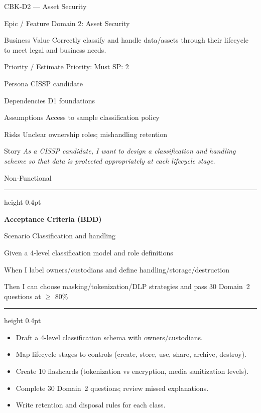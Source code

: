 \documentclass[11pt,a4paper]{article}
\providecommand{\square}{\fbox{\rule{0pt}{0.85ex}\rule{0.85ex}{0pt}}}%
\newcommand{\citem}{\item[$\square$]}
\newcommand{\Tag}[1]{\tcbox[on line, colback=PillBack, colframe=PillBack,
  coltext=PillText, boxrule=0pt, arc=2mm, left=2pt, right=2pt, top=1pt, bottom=1pt]{\small #1}}
\newcommand{\ThinRule}{\par\vspace{4pt}\hrule height 0.4pt\par\vspace{4pt}}
\begin{document}
\clearpage
\begin{StoryCardBox}{CBK-D2 --- Asset Security}
\begin{metadesc}
\item[Epic / Feature] Domain 2: Asset Security
\item[Business Value] Correctly classify and handle data/assets through their lifecycle to meet legal and business needs.
\item[Priority / Estimate] Priority: Must \quad SP: 2
\item[Persona] CISSP candidate
\item[Dependencies] D1 foundations
\item[Assumptions] Access to sample classification policy
\item[Risks] Unclear ownership roles; mishandling retention
\item[Story] \textit{As a CISSP candidate, I want to design a classification and handling scheme so that data is protected appropriately at each lifecycle stage.}
\item[Non-Functional] \Tag{Security} \Tag{Privacy} \Tag{Compliance}
\end{metadesc}

\ThinRule
\textbf{Acceptance Criteria (BDD)}
\begin{metadesc}
\item[Scenario] Classification and handling
\item[Given] a 4-level classification model and role definitions
\item[When] I label owners/custodians and define handling/storage/destruction
\item[Then] I can choose masking/tokenization/DLP strategies and pass 30 Domain~2 questions at $\geq$ 80\%
\end{metadesc}

\ThinRule
\begin{TasksBox}
\begin{itemize}
  \citem Draft a 4-level classification schema with owners/custodians.
  \citem Map lifecycle stages to controls (create, store, use, share, archive, destroy).
  \citem Create 10 flashcards (tokenization vs encryption, media sanitization levels).
  \citem Complete 30 Domain~2 questions; review missed explanations.
  \citem Write retention and disposal rules for each class.
\end{itemize}
\end{TasksBox}
\end{StoryCardBox}
\end{document}
